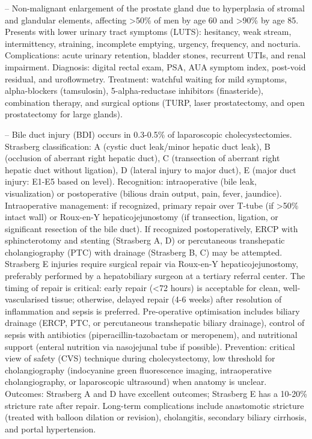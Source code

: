 -- Non-malignant enlargement of the prostate gland due to hyperplasia of stromal and glandular elements, affecting >50\% of men by age 60 and >90\% by age 85. Presents with lower urinary tract symptoms (LUTS): hesitancy, weak stream, intermittency, straining, incomplete emptying, urgency, frequency, and nocturia. Complications: acute urinary retention, bladder stones, recurrent UTIs, and renal impairment. Diagnosis: digital rectal exam, PSA, AUA symptom index, post-void residual, and uroflowmetry. Treatment: watchful waiting for mild symptoms, alpha-blockers (tamsulosin), 5-alpha-reductase inhibitors (finasteride), combination therapy, and surgical options (TURP, laser prostatectomy, and open prostatectomy for large glands).

-- Bile duct injury (BDI) occurs in 0.3-0.5\% of laparoscopic cholecystectomies. Strasberg classification: A (cystic duct leak/minor hepatic duct leak), B (occlusion of aberrant right hepatic duct), C (transection of aberrant right hepatic duct without ligation), D (lateral injury to major duct), E (major duct injury: E1-E5 based on level). Recognition: intraoperative (bile leak, visualization) or postoperative (bilious drain output, pain, fever, jaundice). Intraoperative management: if recognized, primary repair over T-tube (if >50\% intact wall) or Roux-en-Y hepaticojejunostomy (if transection, ligation, or significant resection of the bile duct). If recognized postoperatively, ERCP with sphincterotomy and stenting (Strasberg A, D) or percutaneous transhepatic cholangiography (PTC) with drainage (Strasberg B, C) may be attempted. Strasberg E injuries require surgical repair via Roux-en-Y hepaticojejunostomy, preferably performed by a hepatobiliary surgeon at a tertiary referral center. The timing of repair is critical: early repair (<72 hours) is acceptable for clean, well-vascularised tissue; otherwise, delayed repair (4-6 weeks) after resolution of inflammation and sepsis is preferred. Pre-operative optimisation includes biliary drainage (ERCP, PTC, or percutaneous transhepatic biliary drainage), control of sepsis with antibiotics (piperacillin-tazobactam or meropenem), and nutritional support (enteral nutrition via nasojejunal tube if possible). Prevention: critical view of safety (CVS) technique during cholecystectomy, low threshold for cholangiography (indocyanine green fluorescence imaging, intraoperative cholangiography, or laparoscopic ultrasound) when anatomy is unclear. Outcomes: Strasberg A and D have excellent outcomes; Strasberg E has a 10-20\% stricture rate after repair. Long-term complications include anastomotic stricture (treated with balloon dilation or revision), cholangitis, secondary biliary cirrhosis, and portal hypertension.

